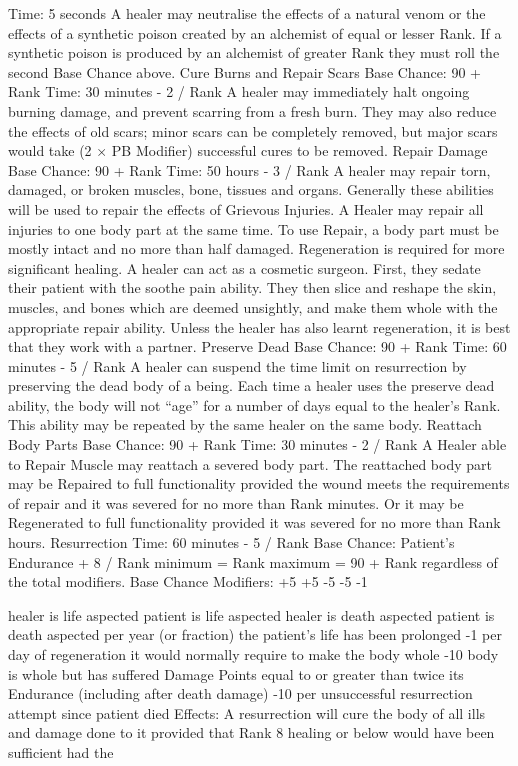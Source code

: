 \documentclass[a4paper]{article}
\begin{document}
\begin{multicols}{3}
Time: 5 seconds
A healer may neutralise the effects of a natural
venom or the effects of a synthetic poison created
by an alchemist of equal or lesser Rank. If a synthetic poison is produced by an alchemist of greater
Rank they must roll the second Base Chance
above.
Cure Burns and Repair Scars
Base Chance: 90 + Rank
Time: 30 minutes - 2 / Rank
A healer may immediately halt ongoing burning
damage, and prevent scarring from a fresh burn.
They may also reduce the effects of old scars;
minor scars can be completely removed, but major
scars would take (2 × PB Modifier) successful
cures to be removed.
Repair Damage
Base Chance: 90 + Rank
Time: 50 hours - 3 / Rank
A healer may repair torn, damaged, or broken
muscles, bone, tissues and organs. Generally these
abilities will be used to repair the effects of Grievous Injuries.
A Healer may repair all injuries to one body part at
the same time. To use Repair, a body part must be
mostly intact and no more than half damaged.
Regeneration is required for more significant healing.
A healer can act as a cosmetic surgeon. First, they
sedate their patient with the soothe pain ability.
They then slice and reshape the skin, muscles, and
bones which are deemed unsightly, and make them
whole with the appropriate repair ability. Unless
the healer has also learnt regeneration, it is best
that they work with a partner.
Preserve Dead
Base Chance: 90 + Rank
Time: 60 minutes - 5 / Rank
A healer can suspend the time limit on resurrection
by preserving the dead body of a being. Each time
a healer uses the preserve dead ability, the body
will not “age” for a number of days equal to the
healer’s Rank. This ability may be repeated by the
same healer on the same body.
Reattach Body Parts
Base Chance: 90 + Rank
Time: 30 minutes - 2 / Rank
A Healer able to Repair Muscle may reattach a
severed body part. The reattached body part may
be Repaired to full functionality provided the
wound meets the requirements of repair and it was
severed for no more than Rank minutes. Or it may
be Regenerated to full functionality provided it was
severed for no more than Rank hours.
Resurrection
Time: 60 minutes - 5 / Rank
Base Chance: Patient’s Endurance + 8 / Rank
minimum = Rank
maximum = 90 + Rank
regardless of the total modifiers.
Base Chance Modifiers:
+5
+5
-5
-5
-1

healer is life aspected
patient is life aspected
healer is death aspected
patient is death aspected
per year (or fraction) the patient’s life has
been prolonged
-1
per day of regeneration it would normally
require to make the body whole
-10 body is whole but has suffered Damage
Points equal to or greater than twice its
Endurance (including after death damage)
-10 per unsuccessful resurrection attempt since
patient died
Effects: A resurrection will cure the body of all ills
and damage done to it provided that Rank 8 healing or below would have been sufficient had the


\end{multicols}
\end{document}
